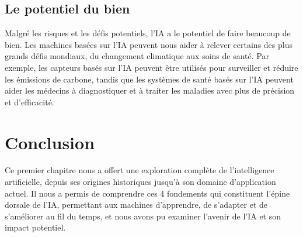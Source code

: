 \subsection{Le potentiel du bien}
Malgré les risques et les défis potentiels, l’IA a le potentiel de faire beaucoup de bien. Les machines basées sur l'IA peuvent nous aider à relever certains des plus grands défis mondiaux, du changement climatique aux soins de santé. Par exemple, les capteurs basés sur l’IA peuvent être utilisés pour surveiller et réduire les émissions de carbone, tandis que les systèmes de santé basés sur l’IA peuvent aider les médecins à diagnostiquer et à traiter les maladies avec plus de précision et d’efficacité.

\section{Conclusion}
Ce premier chapitre nous a offert une exploration complète de l'intelligence artificielle, depuis ses origines historiques jusqu'à son domaine d'application actuel. Il nous a permis de comprendre ces 4 fondements qui constituent l'épine dorsale de l'IA, permettant aux machines d'apprendre, de s'adapter et de s'améliorer au fil du temps, et nous avons pu examiner l'avenir de l'IA et son impact potentiel.
